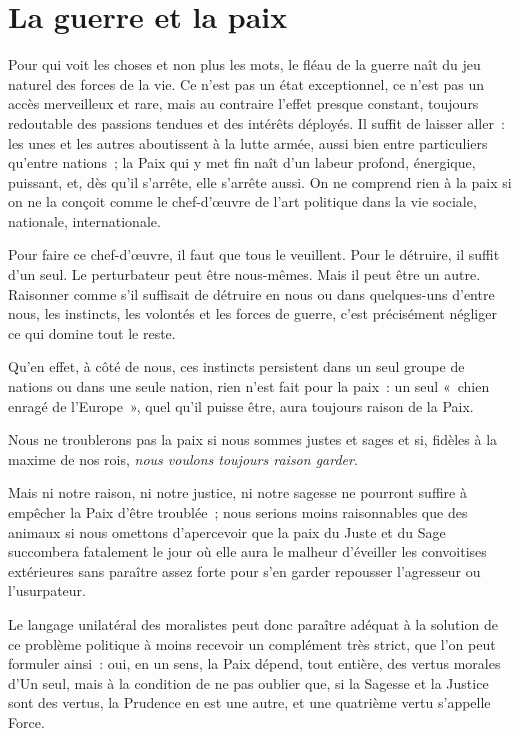 \documentclass[french,twoside]{book} %
\begin{document}
\section[{La guerre et la paix}]{La guerre et la paix}
\noindent Pour qui voit les choses et non plus les mots, le fléau de la guerre naît du jeu naturel des forces de la vie. Ce n’est pas un état exceptionnel, ce n’est pas un accès merveilleux et rare, mais au contraire l’effet presque constant, toujours redoutable des passions tendues et des intérêts déployés. Il suffit de laisser aller : les unes et les autres aboutissent à la lutte armée, aussi bien entre particuliers qu’entre nations ; la Paix qui y met fin naît d’un labeur profond, énergique, puissant, et, dès qu’il s’arrête, elle s’arrête aussi. On ne comprend rien à la paix si on ne la conçoit comme le chef-d’œuvre de l’art politique dans la vie sociale, nationale, internationale.\par
Pour faire ce chef-d’œuvre, il faut que tous le veuillent. Pour le détruire, il suffit d’un seul. Le perturbateur peut être nous-mêmes. Mais il peut être un autre. Raisonner comme s’il suffisait de détruire en nous ou dans quelques-uns d’entre nous, les instincts, les volontés et les forces de guerre, c’est précisément négliger ce qui domine tout le reste.\par
Qu’en effet, à côté de nous, ces instincts persistent dans un seul groupe de nations ou dans une seule nation, rien n’est fait pour la paix : un seul « chien enragé de l’Europe », quel qu’il puisse être, aura toujours raison de la Paix.\par
Nous ne troublerons pas la paix si nous sommes justes et sages et si, fidèles à la maxime de nos rois, \emph{nous voulons toujours raison garder}.\par
Mais ni notre raison, ni notre justice, ni notre sagesse ne pourront suffire à empêcher la Paix d’être troublée ; nous serions moins raisonnables que des animaux si nous omettons d’apercevoir que la paix du Juste et du Sage succombera fatalement le jour où elle aura le malheur d’éveiller les convoitises extérieures sans paraître assez forte pour s’en garder repousser l’agresseur ou l’usurpateur.\par
Le langage unilatéral des moralistes peut donc paraître adéquat à la solution de ce problème politique à moins recevoir un complément très strict, que l’on peut formuler ainsi : oui, en un sens, la Paix dépend, tout entière, des vertus morales d’Un seul, mais à la condition de ne pas oublier que, si la Sagesse et la Justice sont des vertus, la Prudence en est une autre, et une quatrième vertu s’appelle Force.\par
\end{document}
